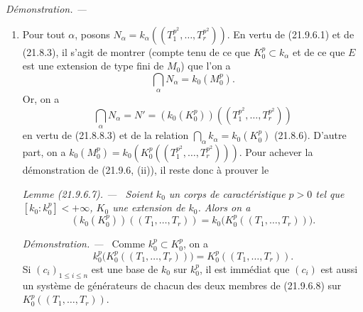 \documentclass[10pt,oneside]{book}
\makeatletter
\newcommand{\setmanualcurrentlabel}[1]{\def\@currentlabel{#1}}
\newcommand{\oldpage}[2][]{%
  \setcounter{footnote}{0}%
  \marginpar{\scriptsize\textbf{#1}~|~#2}\ignorespaces}
\newenvironment{lemma}[1][]{%
  \setmanualcurrentlabel{#1}\par\medskip\noindent\itshape Lemme (#1). ---\ }{\par}
\newenvironment{proof}{%
  \par\medskip\noindent\textit{Démonstration. ---\ }}{\par}
\makeatother
\begin{document}
\begin{proof}
\begin{enumerate}
  \oldpage[0\textsubscript{IV-1}]{181}
  on a
  \[
    d(E/L_0,k/k_0)=d(E/K_0,k/k_0)=d(E/M_0,k/k_0),
  \]
  d'où, par une dernière application de (21.6.4.2),
  \[
    \delta=d(E/M_0,N/k_0),
  \]
  ce qui prouve (21.9.6.1). En outre, lorsque $k$ est remplacé par une
  sous-extension $k'$ de $k_0$, $N$ est remplacé par une sous-extension $N'$,
  donc $d(E/M_0,N'/k_0)\leqslant d(E/M_0,N/k_0)$ (21.6.4.2), ce qui démontre
  la dernière assertion de (i).

  \item[(ii)] Pour tout $\alpha$, posons
  $N_\alpha=k_\alpha((T_1^{p^2},\ldots,T_r^{p^2}))$. En vertu de (21.9.6.1)
  et de (21.8.3), il s'agit de montrer (compte tenu de ce que
  $K_0^p\subset k_\alpha$ et de ce que $E$ est une extension de type fini de
  $M_0$) que l'on a
  \[
    \bigcap_\alpha N_\alpha=k_0(M_0^p).
  \]
  Or, on a
  \begin{equation}
  \tag{21.9.6.6}
  \label{0.21.9.6.6-fr}
    \bigcap_\alpha N_\alpha=N'
    =(k_0(K_0^p))((T_1^{p^2},\ldots,T_r^{p^2}))
  \end{equation}
  en vertu de (21.8.8.3) et de la relation
  $\bigcap_\alpha k_\alpha=k_0(K_0^p)$ (21.8.6). D'autre part, on a
  $k_0(M_0^p)=k_0(K_0^p((T_1^{p^2},\ldots,T_r^{p^2})))$. Pour achever la
  démonstration de (21.9.6, (ii)), il reste donc à prouver le

  \begin{lemma}[21.9.6.7]
  \label{0.21.9.6.7-fr}
  Soient $k_0$ un corps de caractéristique $p>0$ tel que
  $[k_0:k_0^p]<+\infty$, $K_0$ une extension de $k_0$. Alors on a
  \begin{equation}
  \tag{21.9.6.8}
  \label{0.21.9.6.8-fr}
    (k_0(K_0^p))((T_1,\ldots,T_r))
    =k_0\bigl(K_0^p((T_1,\ldots,T_r))\bigr).
  \end{equation}
  \end{lemma}

  \begin{proof}
  Comme $k_0^p\subset K_0^p$, on a
  \[
    k_0^p\bigl(K_0^p((T_1,\ldots,T_r))\bigr)
    =K_0^p((T_1,\ldots,T_r)).
  \]
  Si $(c_i)_{1\leqslant i\leqslant n}$ est une base de $k_0$ sur $k_0^p$,
  il est immédiat que $(c_i)$ est aussi un système de générateurs de chacun
  des deux membres de (21.9.6.8) sur $K_0^p((T_1,\ldots,T_r))$.
  \end{proof}
\end{enumerate}
\end{proof}
\end{document}
